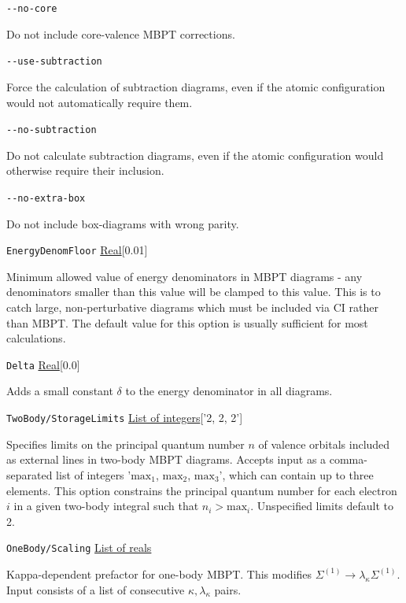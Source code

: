 \documentclass{report}
\begin{document}
\texttt{{-}{-}no-core}
\begin{adjustwidth}{1cm}{}
Do not include core-valence MBPT corrections.
\end{adjustwidth}

\texttt{{-}{-}use-subtraction}
\begin{adjustwidth}{1cm}{}
Force the calculation of subtraction diagrams, even if the atomic configuration would not automatically
require them.
\end{adjustwidth}

\texttt{{-}{-}no-subtraction}
\begin{adjustwidth}{1cm}{}
Do not calculate subtraction diagrams, even if the atomic configuration would otherwise require their
inclusion.
\end{adjustwidth}

\texttt{{-}{-}no-extra-box}
\begin{adjustwidth}{1cm}{}
Do not include box-diagrams with wrong parity.
\end{adjustwidth}

\texttt{EnergyDenomFloor} \uline{Real}[0.01]
\begin{adjustwidth}{1cm}{}
Minimum allowed value of energy denominators in MBPT diagrams - any denominators smaller than this value
will be clamped to this value. This is to catch large, non-perturbative diagrams which must be
included via CI rather than MBPT. The default value for this option is usually sufficient for most 
calculations.
\end{adjustwidth}

\texttt{Delta} \uline{Real}[0.0]
\begin{adjustwidth}{1cm}{}
Adds a small constant $\delta$ to the energy denominator in all diagrams.
\end{adjustwidth}

\texttt{TwoBody/StorageLimits} \uline{List of integers}['2, 2, 2']
\begin{adjustwidth}{1cm}{}
Specifies limits on the principal quantum number $n$ of
valence orbitals included as external lines in two-body MBPT diagrams. Accepts input as a 
comma-separated list of integers '$\mathrm{max}_1$, $\mathrm{max}_2$, $\mathrm{max}_3$', which can 
contain up to three elements. This option constrains the principal quantum number for each electron $i$ 
in a given two-body integral such that $n_i > \mathrm{max}_i$. Unspecified limits default to 2.
\end{adjustwidth}

\texttt{OneBody/Scaling} \uline{List of reals}
\begin{adjustwidth}{1cm}{}
Kappa-dependent prefactor for one-body MBPT. This modifies $\Sigma^{(1)} \to \lambda_{\kappa}
\Sigma^{(1)}$. Input consists of a list of consecutive $\kappa, \lambda_{\kappa}$ pairs.
\end{adjustwidth}
\end{document}

